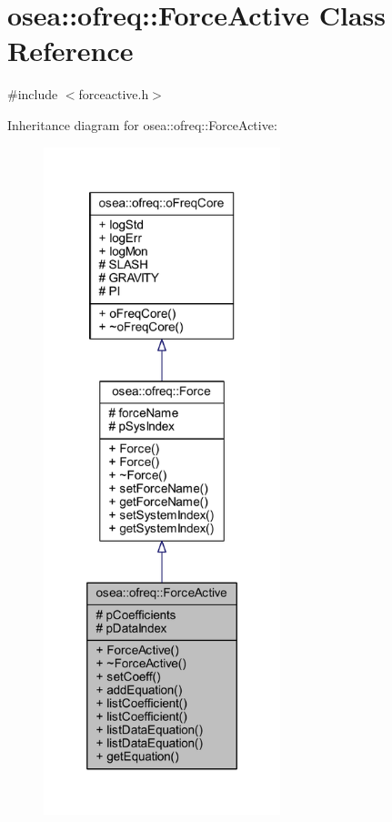 \hypertarget{classosea_1_1ofreq_1_1_force_active}{\section{osea\-:\-:ofreq\-:\-:Force\-Active Class Reference}
\label{classosea_1_1ofreq_1_1_force_active}
}


{\ttfamily \#include $<$forceactive.\-h$>$}



Inheritance diagram for osea\-:\-:ofreq\-:\-:Force\-Active\-:
\nopagebreak
\begin{figure}[H]
\begin{center}
\leavevmode
\includegraphics[height=550pt]{classosea_1_1ofreq_1_1_force_active__inherit__graph}
\end{center}
\end{figure}
